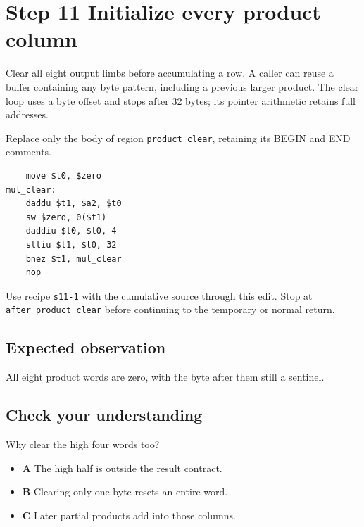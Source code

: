 \section{Step 11 Initialize every product column}\label{rsa-s11}

Clear all eight output limbs before accumulating a row. A caller can reuse a buffer containing any byte pattern, including a previous larger product. The clear loop uses a byte offset and stops after 32 bytes; its pointer arithmetic retains full addresses.

Replace only the body of region \texttt{product\_clear}, retaining its BEGIN and END comments.

\begin{verbatim}
    move $t0, $zero
mul_clear:
    daddu $t1, $a2, $t0
    sw $zero, 0($t1)
    daddiu $t0, $t0, 4
    sltiu $t1, $t0, 32
    bnez $t1, mul_clear
    nop
\end{verbatim}

Use recipe \texttt{s11-1} with the cumulative source through this edit. Stop at \texttt{after\_product\_clear} before continuing to the temporary or normal return.

\subsection{Expected observation}
All eight product words are zero, with the byte after them still a sentinel.

\subsection{Check your understanding}
Why clear the high four words too?

\begin{itemize}
\item \textbf{A} The high half is outside the result contract.
\item \textbf{B} Clearing only one byte resets an entire word.
\item \textbf{C} Later partial products add into those columns.
\end{itemize}
